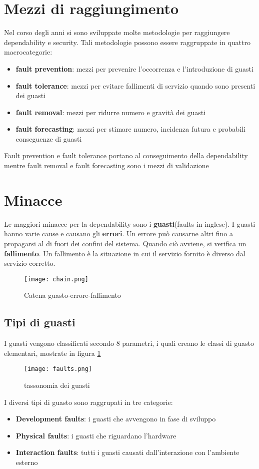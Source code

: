\section{Mezzi di raggiungimento}
Nel corso degli anni si sono sviluppate molte metodologie per raggiungere dependability e security. Tali metodologie possono essere raggruppate in quattro macrocategorie:
\begin{itemize}
    \item \textbf{fault prevention}: mezzi per prevenire l'occorrenza e l'introduzione di guasti
    \item \textbf{fault tolerance}: mezzi per evitare fallimenti di servizio quando sono presenti dei guasti
    \item \textbf{fault removal}: mezzi per ridurre numero e gravità dei guasti
    \item \textbf{fault forecasting}: mezzi per stimare numero, incidenza futura e probabili conseguenze di guasti
\end{itemize}
Fault prevention e fault tolerance portano al conseguimento della dependability mentre fault removal e fault forecasting sono i mezzi di validazione
\section{Minacce}
Le maggiori minacce per la dependability sono i \textbf{guasti}(faults in inglese). I guasti hanno varie cause e causano gli \textbf{errori}. Un errore può causarne altri fino a propagarsi
al di fuori dei confini del sistema. Quando ciò avviene, si verifica un \textbf{fallimento}. Un fallimento è la situazione in cui il servizio fornito
è diverso dal servizio corretto.
\begin{figure}[h]
    \texttt{[image: chain.png]}
    \caption{Catena guasto-errore-fallimento}
\end{figure}
\subsection{Tipi di guasti}
I guasti vengono classificati secondo 8 parametri, i quali creano le classi di guasto elementari, mostrate in figura \ref{fig:tax}
\begin{figure}[h]
    \texttt{[image: faults.png]}
    \caption{tassonomia dei guasti\cite{tax}}
    \label{fig:tax}
\end{figure}
 I diversi tipi di guasto sono raggrupati in tre categorie:
 \begin{itemize}
     \item \textbf{Development faults}: i guasti che avvengono in fase di sviluppo
     \item \textbf{Physical faults}: i guasti che riguardano l'hardware
     \item \textbf{Interaction faults}: tutti i guasti causati dall'interazione con l'ambiente esterno
 \end{itemize}
 \newpage
